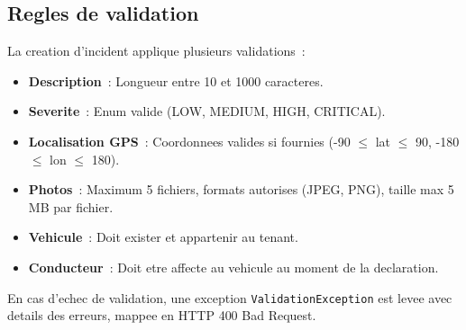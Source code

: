 \documentclass[12pt,a4paper]{report}
\begin{document}
\subsection{Regles de validation}

La creation d'incident applique plusieurs validations~:

\begin{itemize}[leftmargin=2cm]
  \item \textbf{Description}~: Longueur entre 10 et 1000 caracteres.
  \item \textbf{Severite}~: Enum valide (LOW, MEDIUM, HIGH, CRITICAL).
  \item \textbf{Localisation GPS}~: Coordonnees valides si fournies (-90 $\leq$ lat $\leq$ 90, -180 $\leq$ lon $\leq$ 180).
  \item \textbf{Photos}~: Maximum 5 fichiers, formats autorises (JPEG, PNG), taille max 5 MB par fichier.
  \item \textbf{Vehicule}~: Doit exister et appartenir au tenant.
  \item \textbf{Conducteur}~: Doit etre affecte au vehicule au moment de la declaration.
\end{itemize}

En cas d'echec de validation, une exception \texttt{ValidationException}
est levee avec details des erreurs, mappee en HTTP 400 Bad Request.
\end{document}
